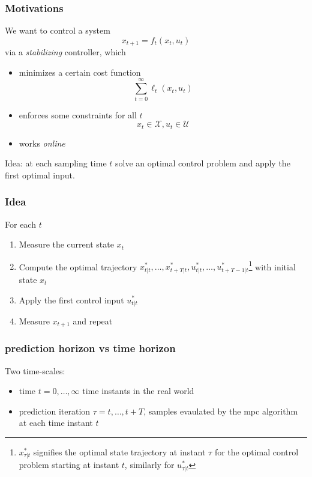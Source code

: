 \documentclass[openany]{book}
\theoremstyle{definition}
\theoremstyle{remark}
\begin{document}
\subsubsection{Motivations}
We want to control a system 
\[
    x_{t+1} = f_t(x_t,u_t)
\]
via a \emph{stabilizing} controller, which
\begin{itemize}
    \item minimizes a certain cost function \[
            \displaystyle\sum_{t=0}^{\infty}\ell_t(x_t,u_t)
        \]
    \item enforces some constraints for all $t$ 
        \[
            x_t \in \mathcal{X}, u_t \in \mathcal{U}
        \]
    \item works \emph{online}
\end{itemize}
Idea: at each sampling time $t$ solve an optimal control problem and apply the first optimal input.
\subsubsection{Idea} %
For each $t$
\begin{enumerate}
    \item Measure the current state $x_t$ 
    \item Compute the optimal trajectory $x^*_{t|t},\dots,x^*_{t+T|t},u^*_{t|t},\dots,u^*_{t+T-1|t}$\footnote{$x^*_{\tau|t}$ signifies the optimal state trajectory at instant $\tau$ for the optimal control problem starting at instant $t$, similarly for $u^*_{\tau|t}$} with initial state $x_t$
    \item Apply the first control input $u^*_{t|t}$
    \item Measure $x_{t+1}$ and repeat
\end{enumerate}
\subsubsection{prediction horizon vs time horizon}
Two time-scales: 
\begin{itemize}
    \item time $t=0,\dots,\infty$ time instants in the real world 
    \item prediction iteration $\tau=t,\dots,t+T$, samples evaulated by the mpc algorithm at each time instant $t$
\end{itemize}
\end{document}
